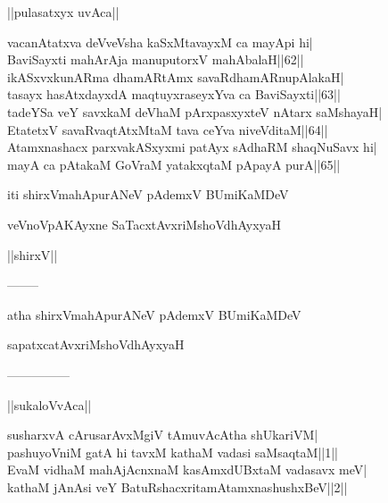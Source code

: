 \documentclass{article}
\begin{document}
\begin{center}
||pulasatxyx uvAca||
\end{center}

vacanAtatxva deVveVsha kaSxMtavayxM ca mayApi hi|\\
BaviSayxti mahArAja manuputorxV mahAbalaH||62||\\
ikASxvxkunARma dhamARtAmx savaRdhamARnupAlakaH|\\
tasayx hasAtxdayxdA maqtuyxraseyxYva ca BaviSayxti||63||\\
tadeYSa veY savxkaM deVhaM pArxpasxyxteV nAtarx saMshayaH|\\
EtatetxV savaRvaqtAtxMtaM tava ceYva niveVditaM||64||\\
Atamxnashacx parxvakASxyxmi patAyx sAdhaRM shaqNuSavx hi|\\
mayA ca pAtakaM GoVraM yatakxqtaM pApayA purA||65||

\begin{center}
iti shirxVmahApurANeV pAdemxV BUmiKaMDeV
\end{center}

\begin{center}
veVnoVpAKAyxne SaTacxtAvxriMshoVdhAyxyaH
\end{center}

\begin{center}
||shirxV||
\end{center}

\begin{center}
--------
\end{center}

\begin{center}
atha shirxVmahApurANeV pAdemxV BUmiKaMDeV
\end{center}

\begin{center}
sapatxcatAvxriMshoVdhAyxyaH
\end{center}

\begin{center}
---------------
\end{center}

\begin{center}
||sukaloVvAca||
\end{center}

susharxvA cArusarAvxMgiV tAmuvAcAtha shUkariVM|\\
pashuyoVniM gatA hi tavxM kathaM vadasi saMsaqtaM||1||\\
EvaM vidhaM mahAjAcnxnaM kasAmxdUBxtaM vadasavx meV|\\
kathaM jAnAsi veY BatuRshacxritamAtamxnashushxBeV||2||\\
\end{document}
